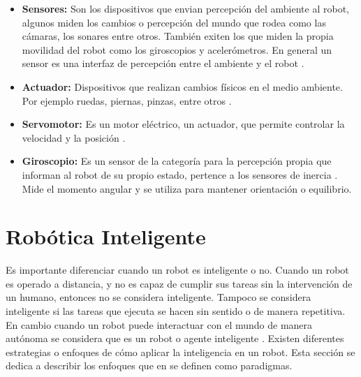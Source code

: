 \begin{itemize}
\item{\textbf{Sensores:} Son los dispositivos que envian percepci\'on del ambiente al robot, algunos miden los cambios o percepci\'on del mundo que rodea como las c\'amaras, los sonares entre otros. Tambi\'en exiten los que miden la propia movilidad del robot como los giroscopios y aceler\'ometros. En general un sensor es una interfaz de percepci\'on entre el ambiente y el robot  \cite{peterAndNorvig}.}


\item{\textbf{Actuador:} Dispositivos que realizan cambios f\'isicos en el medio ambiente. Por ejemplo ruedas, piernas, pinzas, entre otros \cite{peterNorvig}.}

\item{\textbf{Servomotor:}  Es un motor eléctrico, un actuador, que permite controlar la velocidad y la posici\'on  \cite{AiRobotics}. }


\item{\textbf{Giroscopio:} Es un sensor de la categor\'ia para la percepci\'on propia que informan al robot de su propio estado, pertence a los sensores de inercia \cite{peterNorvig}. Mide el momento angular y se utiliza para mantener orientaci\'on o equilibrio.}

\end{itemize}

\section{Robótica Inteligente} \label{sect:AgentesInteligentes}

Es importante diferenciar cuando un robot es inteligente o no. Cuando un robot es operado a distancia, y no es capaz de cumplir sus tareas sin la intervención de un humano, entonces no se considera  inteligente. Tampoco se considera inteligente si las tareas que ejecuta se hacen sin sentido o de manera repetitiva. En cambio cuando un robot puede interactuar con el mundo de manera autónoma se considera que es un robot o agente inteligente \cite{AiRobotics}. Existen diferentes estrategias o enfoques de cómo aplicar la inteligencia en un robot. Esta sección se dedica a describir los enfoques que en  \cite{AiRobotics} se definen como paradigmas. 
  
